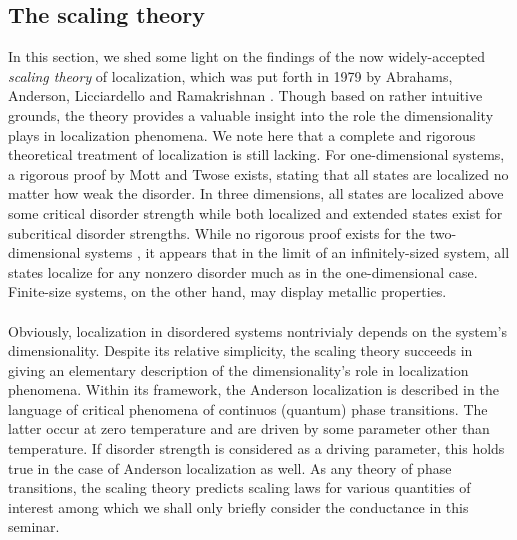 \documentclass[10pt,a4paper]{article}
\begin{document}
\subsection{The scaling theory}
In this section, we shed some light on the findings of the now widely-accepted \emph{scaling theory} of localization, which was put forth in 1979 by Abrahams, Anderson, Licciardello and Ramakrishnan \cite{scaling}. Though based on rather intuitive grounds, the theory provides a valuable insight into the role the dimensionality plays in localization phenomena. We note here that a complete and rigorous theoretical treatment of localization is still lacking. 
For one-dimensional systems, a rigorous proof by Mott and Twose \cite{Mott_Twose} exists, stating that all states are localized no matter how weak the disorder. In three dimensions, all states are localized above some critical disorder strength while both localized and extended states exist for subcritical disorder strengths. While no rigorous proof exists for the two-dimensional systems \cite{Kramer}, it appears that in the limit of an infinitely-sized system, all states localize for any nonzero disorder much as in the one-dimensional case. Finite-size systems, on the other hand, may display metallic properties.  
\\\\
\noindent Obviously, localization in disordered systems nontrivialy depends on the system's dimensionality. Despite its relative simplicity, the scaling theory succeeds in giving an elementary description of the dimensionality's role in localization phenomena. Within its framework, the Anderson localization is described in the language of critical phenomena of continuos (quantum) phase transitions. The latter occur at zero temperature and are driven by some parameter other than temperature. If disorder strength is considered as a driving parameter, this holds true in the case of Anderson localization as well. As any theory of phase transitions, the scaling theory predicts scaling laws for various quantities of interest among which we shall only briefly consider the conductance in this seminar. \\\\
\noindent
\end{document}
